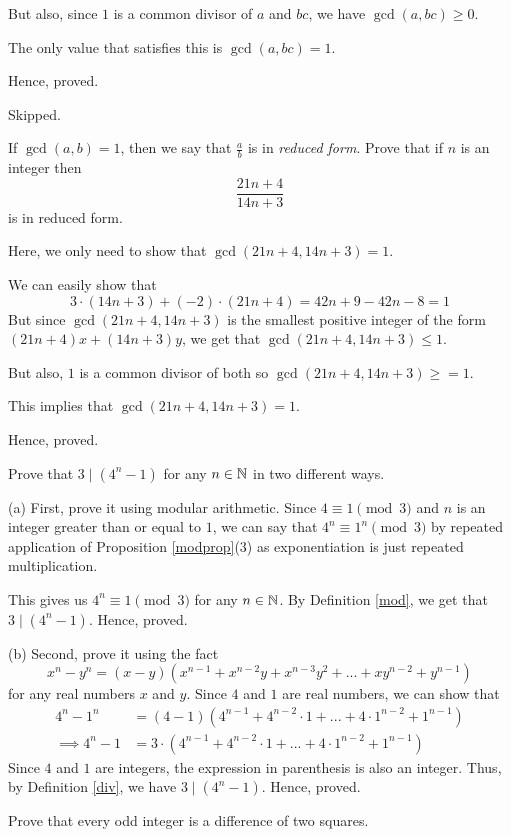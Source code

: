 But also, since $1$ is a common divisor of $a$ and $bc$, we have $\gcd(a, bc) \geq 0$.

The only value that satisfies this is $\gcd(a, bc) = 1$.

Hence, proved.
\es


\bp Skipped.\ep 

\bp 
	If $\gcd(a, b) = 1$, then we say that $\frac{a}{b}$ is in \emph{reduced form}. Prove that if $n$ is an integer then $$\frac{21n+4}{14n+3}$$ is in reduced form.
\ep 

\bs
	Here, we only need to show that $\gcd(21n+4, 14n+3) = 1$.

	We can easily show that 
	$$3 \cdot (14n+3) + (-2) \cdot (21n+4) = 42n + 9 - 42n - 8 = 1$$
	But since $\gcd(21n+4, 14n+3)$ is the smallest positive integer of the form $(21n+4)x + (14n+3)y$, we get that $\gcd(21n+4, 14n+3) \leq 1$.

	But also, $1$ is a common divisor of both so $\gcd(21n+4, 14n+3) \geq = 1$.
	
	This implies that $\gcd(21n+4, 14n+3) = 1$.

	Hence, proved.
\es


\bp  
	Prove that $3 \mid (4^n - 1)$ for any $n \in \mathbb{N}$ in two different ways.

	(a) First, prove it using modular arithmetic.
	\bs
		Since $4 \equiv 1 \pmod{3}$ and $n$ is an integer greater than or equal to $1$, we can say that $4^n \equiv 1^n \pmod{3}$ by repeated application of Proposition \ref{modprop}(3) as exponentiation is just repeated multiplication.

		This gives us $4^n \equiv 1 \pmod{3}$ for any $n \in \mathbb{N}$.
		By Definition \ref{mod}, we get that $3 \mid (4^n-1)$.
		Hence, proved.
	\es
	
	(b) Second, prove it using the fact
	$$x^n - y^n = (x-y)(x^{n-1} + x^{n-2}y + x^{n-3}y^2+ ... + xy^{n-2} + y^{n-1})$$ 
	for any real numbers $x$ and $y$.
	\bs
		Since $4$ and $1$ are real numbers, we can show that 
		\begin{align}
			4^n - 1^n &= (4-1)(4^{n-1} + 4^{n-2} \cdot 1 + ... + 4 \cdot 1^{n-2} + 1^{n-1}) \\
			\implies 4^n - 1 &= 3 \cdot (4^{n-1} + 4^{n-2} \cdot 1 + ... + 4 \cdot 1^{n-2} + 1^{n-1})
		\end{align}
		Since $4$ and $1$ are integers, the expression in parenthesis is also an integer. Thus, by Definition \ref{div}, we have $3 \mid (4^n - 1)$. Hence, proved.
	\es
\ep 


\bp 
	Prove that every odd integer is a difference of two squares.
\ep 

